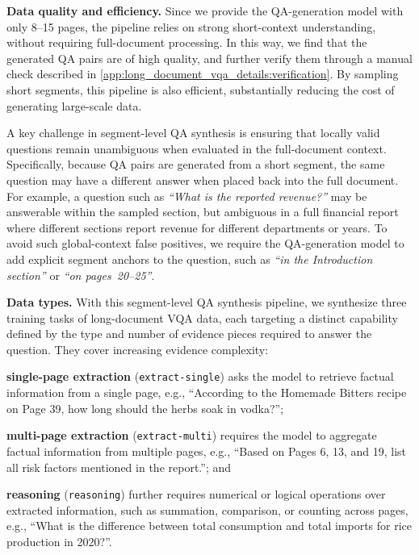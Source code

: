 \documentclass{llmxive}
\providecommand{\extractsingle}{\texttt{extract-single}\xspace}
\providecommand{\extractmulti}{\texttt{extract-multi}\xspace}
\providecommand{\reasoningtask}{\texttt{reasoning}\xspace}
\begin{document}
{\begin{figure}[t]
\end{figure}

\noindent\textbf{Data quality and efficiency.}
Since we provide the QA-generation model with only 8--15 pages, the pipeline relies on strong short-context understanding, without requiring full-document processing.
In this way, we find that the generated QA pairs are of high quality, and further verify them through a manual check described in \cref{app:long_document_vqa_details:verification}.
By sampling short segments, this pipeline is also efficient, substantially reducing the cost of generating large-scale data.

A key challenge in segment-level QA synthesis is ensuring that locally valid questions remain unambiguous when evaluated in the full-document context.
Specifically, because QA pairs are generated from a short segment, the same question may have a different answer when placed back into the full document.
For example, a question such as \textit{``What is the reported revenue?''} may be answerable within the sampled section, but ambiguous in a full financial report where different sections report revenue for different departments or years.
To avoid such global-context false positives, we require the QA-generation model to add explicit segment anchors to the question, such as \textit{``in the Introduction section''} or \textit{``on pages~20--25''}.

\noindent\textbf{Data types.}
With this segment-level QA synthesis pipeline, we synthesize three training tasks of long-document VQA data, each targeting a distinct capability defined by the type and number of evidence pieces required to answer the question.
They cover increasing evidence complexity:
\begin{inparaenum}[(i)]
\item \textbf{single-page extraction} (\extractsingle) asks the model to retrieve factual information from a single page, e.g., ``According to the Homemade Bitters recipe on Page 39, how long should the herbs soak in vodka?'';
\item \textbf{multi-page extraction} (\extractmulti) requires the model to aggregate factual information from multiple pages, e.g., ``Based on Pages 6, 13, and 19, list all risk factors mentioned in the report.''; and
\item \textbf{reasoning} (\reasoningtask) further requires numerical or logical operations over extracted information, such as summation, comparison, or counting across pages, e.g., ``What is the difference between total consumption and total imports for rice production in 2020?''.
\end{inparaenum}

}
\end{document}
